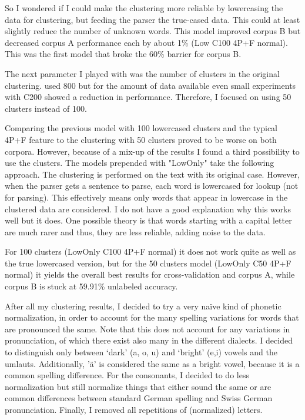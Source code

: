 \documentclass[11pt,letterpaper, covington]{article}
\begin{document}
So I wondered if I could make the clustering more reliable by lowercasing the data for clustering, but feeding the parser the true-cased data. This could at least slightly reduce the number of unknown words. This model improved corpus B but decreased corpus A performance each by about 1\%  (Low C100 4P+F normal).  This was the first model that broke the 60\% barrier for corpus B.


The next parameter I played with was the number of clusters in the original clustering. \cite{KCC08} used 800 but for the amount of data available even small experiments with C200 showed a reduction in performance. Therefore, I focused on using 50 clusters instead of 100. 

Comparing the previous model with 100 lowercased clusters and the typical 4P+F feature to the clustering with 50 clusters proved to be worse on both corpora. However, because of a mix-up of the results I found a third possibility to use the clusters. The models prepended with "LowOnly" take the following approach. The clustering is performed on the text with its original case. However, when the parser gets a sentence to parse, each word is lowercased for lookup (not for parsing). This effectively means only words that appear in lowercase in the clustered data are considered. I do not have a good explanation why this works well but it does. One possible theory is that words starting with a capital letter are much rarer and thus, they are less reliable, adding noise to the data.

For 100 clusters (LowOnly C100 4P+F normal) it does not work quite as well as the true lowercased version, but for the 50 clusters model (LowOnly C50 4P+F normal) it yields the overall best results for cross-validation and corpus A, while corpus B is stuck at 59.91\% unlabeled accuracy. 


After all my clustering results, I decided to try a very naïve kind of phonetic normalization, in order to account for the many spelling variations for words that are pronounced the same. Note that this does not account for any variations in pronunciation, of which there exist also many in the different dialects. I decided to distinguish only between `dark' (a, o, u) and `bright' (e,i) vowels and the umlauts. Additionally, 'ä' is considered the same as a bright vowel, because it is a common spelling difference. For the consonants, I decided to do less normalization but still normalize things that either sound the same or are common differences between standard German spelling and Swiss German pronunciation. Finally, I removed all repetitions of (normalized) letters.
\end{document}
